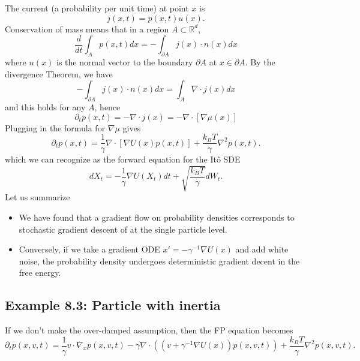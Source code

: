 \documentclass[11pt]{article}
\begin{document}
The current (a probability per unit time) at point $x$ is 
\begin{equation}
j(x,t) = p(x,t)u(x).
\end{equation}
Conservation of mass means that in a region $A \subset {\mathbb R}^d$, 
\begin{equation}
\frac{d}{dt}\int_A p(x,t)dx = - \int_{\partial A} j(x) \cdot n(x)dx
\end{equation}
where $n(x)$ is the normal vector to the boundary $\partial A$ at  $x \in \partial A$. By the divergence Theorem, we have
\begin{equation}
 - \int_{\partial A} j(x) \cdot n(x)dx = \int_A \nabla \cdot j(x) dx
\end{equation}
and this holds for any $A$, hence
\begin{equation}
\partial_t p(x,t) = -\nabla \cdot j(x) =  -\nabla \cdot [\nabla \mu(x)]
\end{equation}
Plugging in the formula for $\nabla \mu$ gives
\begin{equation}
\partial_t p(x,t)  = \frac{1}{\gamma} \nabla \cdot [\nabla U(x) p(x,t)] + \frac{k_BT}{\gamma}\nabla^2 p(x,t).
\end{equation}
which we can recognize as the forward equation for the It\^o SDE
\begin{equation}
dX_t = -\frac{1}{\gamma}\nabla U(X_t)dt + \sqrt{\frac{k_B T}{\gamma}}dW_t.
\end{equation}
Let us summarize
\begin{itemize}
\item We have found that a gradient flow on probability densities corresponds to stochastic gradient descent of at the single particle level. 
\item Conversely, if we take a gradient ODE $x' = -\gamma^{-1}\nabla U(x)$ and add white noise, the probability density undergoes deterministic gradient decent in the free energy. 
\end{itemize}


\subsection*{Example 8.3: Particle with inertia}
If we don't make the over-damped assumption, then the FP equation becomes 
\begin{equation}
\partial_t p(x,v,t)  = \frac{1}{\gamma} v \cdot \nabla_x p(x,v,t) -  \gamma \nabla \cdot \left(( v +\gamma^{-1} \nabla U(x))p(x,v,t) \right) + \frac{k_BT}{\gamma}\nabla^2 p(x,v,t).
\end{equation}
\end{document}
